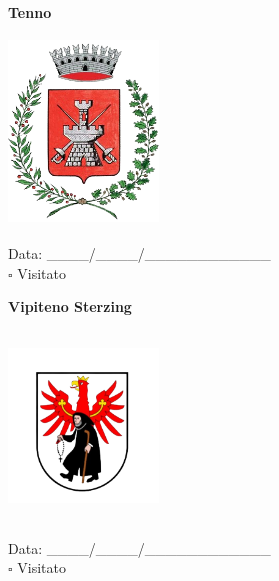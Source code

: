 \documentclass[a5paper,12pt]{article}
\begin{document}
\vspace{0.7cm}

\noindent
\begin{minipage}[t]{0.45\textwidth}
    \begin{center}
        \textbf{Tenno}
    \end{center}
    \vspace{-0.5cm} %
    \begin{center}
        \includegraphics[height= 5cm, width=4cm]{Trentino Alto Adige/Stemma Tenno.png}
    \end{center}
    \vspace{-0.4cm} %
    \begin{flushleft}
        Data: \_\_\_\_/\_\_\_\_/\_\_\_\_\_\_\_\_\_\_\_\_ \\
        $\square$ Visitato
    \end{flushleft}
\end{minipage}
\hfill
\noindent
\begin{minipage}[t]{0.45\textwidth}
    \begin{center}
        \textbf{Vipiteno Sterzing}
    \end{center}
    \vspace{-0.5cm} %
    \begin{center}
        \includegraphics[height= 5cm, width=4cm]{Trentino Alto Adige/Stemma Vipiteno Sterzing.png}
    \end{center}
    \vspace{-0.4cm} %
    \begin{flushleft}
        Data: \_\_\_\_/\_\_\_\_/\_\_\_\_\_\_\_\_\_\_\_\_ \\
        $\square$ Visitato
    \end{flushleft}
\end{minipage}
\hfill
\end{document}
